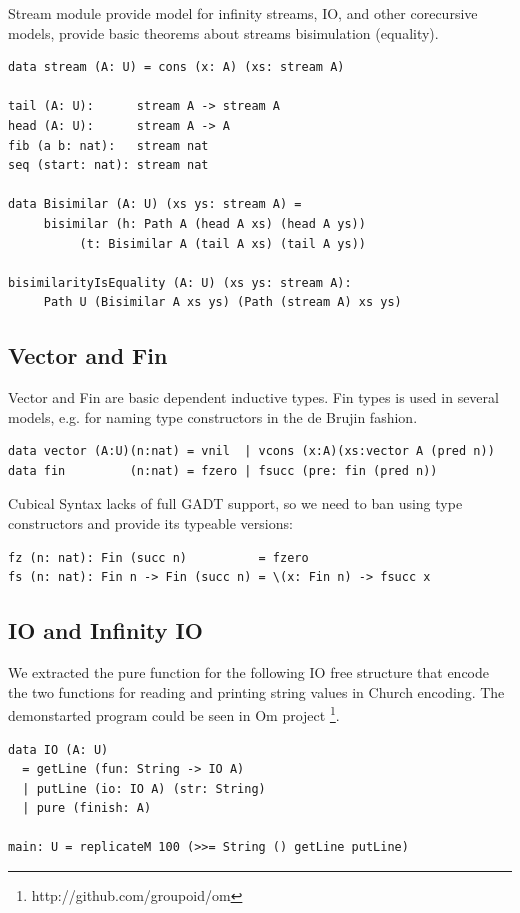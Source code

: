 \documentclass{article}
\begin{document}
Stream module provide model for infinity streams, IO, and other corecursive models,
provide basic theorems about streams bisimulation (equality).

\begin{lstlisting}[mathescape=true]
data stream (A: U) = cons (x: A) (xs: stream A)

tail (A: U):      stream A -> stream A
head (A: U):      stream A -> A
fib (a b: nat):   stream nat
seq (start: nat): stream nat

data Bisimilar (A: U) (xs ys: stream A) =
     bisimilar (h: Path A (head A xs) (head A ys))
          (t: Bisimilar A (tail A xs) (tail A ys))

bisimilarityIsEquality (A: U) (xs ys: stream A):
     Path U (Bisimilar A xs ys) (Path (stream A) xs ys)
\end{lstlisting}

\subsection{Vector and Fin}

Vector and Fin are basic dependent inductive types. Fin types is used
in several models, e.g. for naming type constructors in the de Brujin fashion.

\begin{lstlisting}[mathescape=true]
data vector (A:U)(n:nat) = vnil  | vcons (x:A)(xs:vector A (pred n))
data fin         (n:nat) = fzero | fsucc (pre: fin (pred n))
\end{lstlisting}

Cubical Syntax lacks of full GADT support, so we need to ban using
type constructors and provide its typeable versions:

\begin{lstlisting}[mathescape=true]
fz (n: nat): Fin (succ n)          = fzero
fs (n: nat): Fin n -> Fin (succ n) = \(x: Fin n) -> fsucc x
\end{lstlisting}

\subsection{IO and Infinity IO}

We extracted the pure function for the following IO free structure
that encode the two functions for reading and printing string values in Church encoding.
The demonstarted program could be seen in Om project \footnote{http://github.com/groupoid/om}.

\begin{lstlisting}[mathescape=true]
data IO (A: U)
  = getLine (fun: String -> IO A)
  | putLine (io: IO A) (str: String)
  | pure (finish: A)

main: U = replicateM 100 (>>= String () getLine putLine)
\end{lstlisting}
\end{document}
